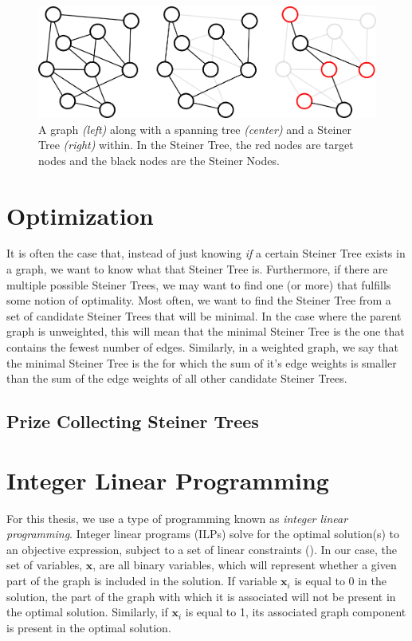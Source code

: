 \documentclass[12pt,twoside]{reedthesis}
\theoremstyle{definition}
\begin{document}
   \begin{figure}[!h]
     \begin{center}
       \includegraphics[width=\textwidth]{graph1}
     \caption[Spanning and Steiner Trees.]{A graph \textit{(left)} along with a spanning tree \textit{(center)} and a Steiner Tree \textit{(right)} within. In the Steiner Tree, the red nodes are target nodes and the black nodes are the Steiner Nodes.}
     \label{fig:graph1}
     \end{center}
   \end{figure}

 \section{Optimization}

 It is often the case that, instead of just knowing \emph{if} a certain Steiner Tree exists in a graph, we want to know what that Steiner Tree is. Furthermore, if there are multiple possible Steiner Trees, we may want to find one (or more) that fulfills some notion of optimality. Most often, we want to find the Steiner Tree from a set of candidate Steiner Trees that will be minimal. In the case where the parent graph is unweighted, this will mean that the minimal Steiner Tree is the one that contains the fewest number of edges. Similarly, in a weighted graph, we say that the minimal Steiner Tree is the for which the sum of it's edge weights is smaller than the sum of the edge weights of all other candidate Steiner Trees.

  \subsection{Prize Collecting Steiner Trees}

 \section{Integer Linear Programming}

  For this thesis, we use a type of programming known as \textit{integer linear programming}. Integer linear programs (ILPs) solve for the optimal solution(s) to an objective expression, subject to a set of linear constraints (\cite{Papadimitriou1998}). In our case, the set of variables, $\mathbf{x}$, are all binary variables, which will represent whether a given part of the graph is included in the solution. If variable $\mathbf{x}_i$ is equal to 0 in the solution, the part of the graph with which it is associated will not be present in the optimal solution. Similarly, if $\mathbf{x}_i$ is equal to 1, its associated graph component is present in the optimal solution.\par
\end{document}
